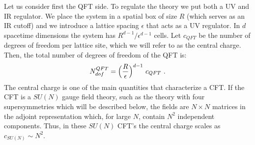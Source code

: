 \documentclass[12pt,notitlepage,a4paper]{article}
\newcommand{\beq}{\begin{equation}}
\newcommand{\eeq}{\end{equation}}
\begin{document}
Let us consider first the QFT side. To regulate the theory we put both a UV and IR regulator. We place the system in a spatial box of size $R$ (which serves as an IR cutoff)  and we introduce a lattice spacing $\epsilon$ that acts as a UV regulator. In $d$ spacetime dimensions the system has $R^{d-1}/\epsilon^{d-1}$ cells. Let $c_{QFT}$ be the number of degrees of freedom per lattice site, which we will refer to as the central charge. Then, the total number of degrees of freedom of the QFT is:
\beq
N_{dof}^{QFT}= \Big({R\over \epsilon}\Big)^{d-1}\,\,c_{QFT}\,\,.
\eeq
The central charge is one of the main quantities that characterize a CFT. If the CFT is  a 
$SU(N)$ gauge field theory,  such as the theory with four supersymmetries which will be described below, the fields are $N\times N$ matrices in the adjoint representation which, for large $N$, contain $N^2$ independent components. Thus, in  these $SU(N)$ CFT's the central charge scales as  $c_{SU(N)}\sim N^2$.
\end{document}
